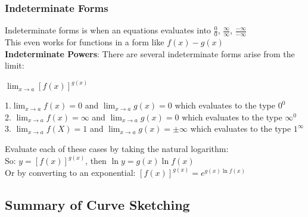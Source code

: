 \documentclass[10pt,a4paper]{article}
\begin{document}
\subsubsection{Indeterminate Forms}
Indeterminate forms is when an equations evaluates into $\frac{0}{0}$, $\frac{\infty}{\infty}$, $\frac{-\infty}{-\infty}$
\\This even works for functions in a form like $f(x) - g(x)$
\\  \textbf{Indeterminate Powers}:
There are several indeterminate forms arise from the limit:
\begin{center}
	$\lim_{x\rightarrow a}{[f(x)]^{g(x)}}$
\end{center}
1.$\lim_{x \rightarrow a}{f(x)} = 0$ and $ \lim_{x \rightarrow a}{g(x)} = 0$ which evaluates to the type $0^{0}$
\\2. $\lim_{x \rightarrow a}{f(x)} = \infty$ and $\lim_{x \rightarrow a}{g(x)} = 0$ which evaluates to the type $\infty^{0}$
\\ 3. $\lim_{x \rightarrow a}{f(X)} = 1$ and $\lim_{x \rightarrow a}{g(x)} = \pm \infty $ which evaluates to the type $1^{\infty}$

Evaluate each of these cases by taking the natural logarithm: 
\\ So: $y=[f(x)]^{g(x)}$, then $\ln y = g(x) \ln f(x)$
\\ Or by converting to an exponential: $[f(x)]^{g(x)} = e^{g(x)\ln f(x)}$

\subsection{Summary of Curve Sketching}
\end{document}
